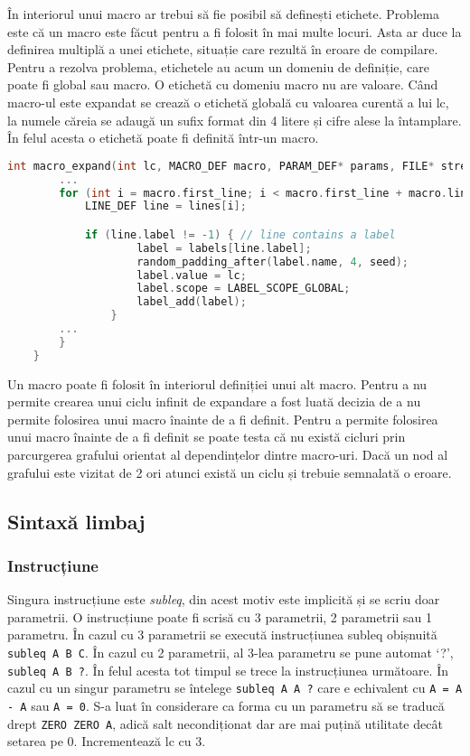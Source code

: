 \documentclass[../main.tex]{subfiles}
\begin{document}
În interiorul unui macro ar trebui să fie posibil să definești etichete. Problema este că un macro este
făcut pentru a fi folosit în mai multe locuri. Asta ar duce la definirea multiplă a unei etichete, situație
care rezultă în eroare de compilare. Pentru a rezolva problema, etichetele au acum un domeniu de definiție,
care poate fi global sau macro. O etichetă cu domeniu macro nu are valoare. Când macro-ul este expandat
se crează o etichetă globală cu valoarea curentă a lui \acrshort{lc}, la numele căreia se adaugă un sufix
format din 4 litere și cifre alese la întamplare. În felul acesta o etichetă poate fi definită într-un
macro.
\noindent\begin{minipage}{\linewidth}
\begin{lstlisting}[caption={Tratarea unei etichete în interiorul unui macro}, language={C}, label={lst:padding}]
    int macro_expand(int lc, MACRO_DEF macro, PARAM_DEF* params, FILE* stream) {
        ...
        for (int i = macro.first_line; i < macro.first_line + macro.line_count; i++) {
            LINE_DEF line = lines[i];

            if (line.label != -1) { // line contains a label
			        label = labels[line.label];
			        random_padding_after(label.name, 4, seed);
			        label.value = lc;
			        label.scope = LABEL_SCOPE_GLOBAL;
			        label_add(label);
		        }
        ...
        }
    }
\end{lstlisting}
\end{minipage}

Un macro poate fi folosit în interiorul definiției unui alt macro. Pentru a nu permite crearea unui
ciclu infinit de expandare a fost luată decizia de a nu permite folosirea unui macro înainte de
a fi definit. Pentru a permite folosirea unui macro înainte de a fi definit se poate testa că nu există
cicluri prin parcurgerea grafului orientat al dependințelor dintre macro-uri. Dacă un nod al grafului 
este vizitat de 2 ori atunci există un ciclu și trebuie semnalată o eroare.

\subsection{Sintaxă limbaj}
\subsubsection{Instrucțiune}
Singura instrucțiune este \emph{subleq}, din acest motiv este implicită și se scriu doar parametrii. O instrucțiune
poate fi scrisă cu 3 parametrii, 2 parametrii sau 1 parametru. În cazul cu 3 parametrii se execută instrucțiunea subleq
obișnuită \texttt{subleq A B C}. În cazul cu 2 parametrii, al 3-lea parametru se pune automat `?', \texttt{subleq A B ?}.
În felul acesta tot timpul se trece la instrucțiunea următoare. În cazul cu un singur parametru se întelege
\texttt{subleq A A ?} care e echivalent cu \texttt{A = A - A} sau \texttt{A = 0}. S-a luat în considerare ca
forma cu un parametru să se traducă drept \texttt{ZERO ZERO A}, adică salt necondiționat dar are mai puțină
utilitate decât setarea pe 0. Incrementează \acrshort{lc} cu 3.
\end{document}
